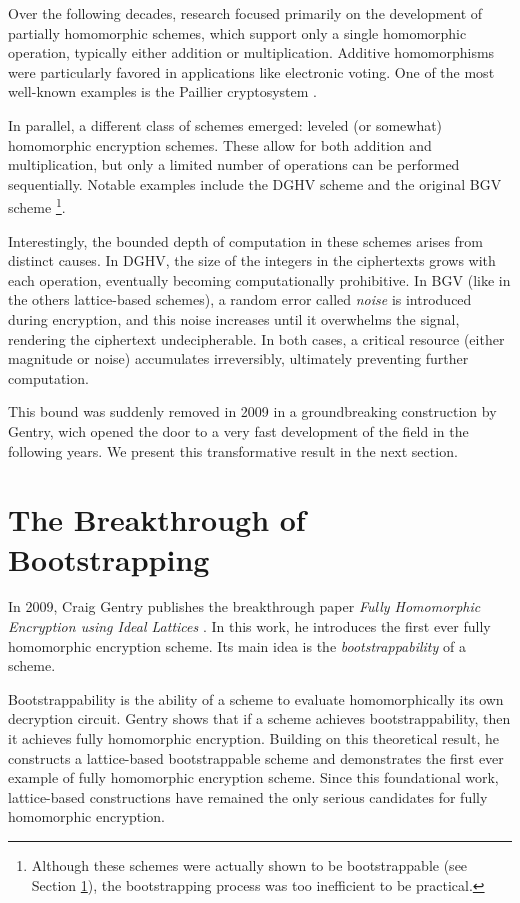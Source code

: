 Over the following decades, research focused primarily on the development of partially homomorphic schemes, which support only a single homomorphic operation, typically either addition or multiplication. Additive homomorphisms were particularly favored in applications like electronic voting. One of the most well-known examples is the Paillier cryptosystem \cite{EC:Paillier99}.

In parallel, a different class of schemes emerged: leveled (or somewhat) homomorphic encryption schemes. These allow for both addition and multiplication, but only a limited number of operations can be performed sequentially. Notable examples include the DGHV scheme \cite{EC:DGHV10} and the original BGV scheme \cite{bgv}\footnote{Although these schemes were actually shown to be bootstrappable (see Section \ref{sec:gentry_bootstrapping}), the bootstrapping process was too inefficient to be practical.}.

Interestingly, the bounded depth of computation in these schemes arises from distinct causes. In DGHV, the size of the integers in the ciphertexts grows with each operation, eventually becoming computationally prohibitive. In BGV (like in the others lattice-based schemes), a random error called \textit{noise} is introduced during encryption, and this noise increases until it overwhelms the signal, rendering the ciphertext undecipherable. In both cases, a critical resource (either magnitude or noise) accumulates irreversibly, ultimately preventing further computation.

This bound was suddenly removed in 2009 in a groundbreaking construction by Gentry, wich opened the door to a very fast development of the field in the following years. We present this transformative result in the next section.

\section{The Breakthrough of Bootstrapping}
\label{sec:gentry_bootstrapping}


In 2009, Craig Gentry publishes the breakthrough paper \textit{Fully Homomorphic Encryption using Ideal Lattices} \cite{STOC:Gentry09}. In this work, he introduces the first ever fully homomorphic encryption scheme. Its main idea is the \textit{bootstrappability} of a scheme.

Bootstrappability is the ability of a scheme to evaluate homomorphically its own decryption circuit. Gentry shows that if a scheme achieves bootstrappability, then it achieves fully homomorphic encryption. Building on this theoretical result, he constructs a lattice-based bootstrappable scheme and demonstrates the first ever example of fully homomorphic encryption scheme. Since this foundational work, lattice-based constructions have remained the only serious candidates for fully homomorphic encryption. 

